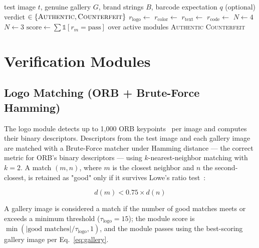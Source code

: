 \documentclass[conference]{IEEEtran}
\begin{document}
\begin{algorithm}[t]
\caption{Cascade Verification}
\label{alg:cascade}
\begin{algorithmic}[1]
\Require test image $t$, genuine gallery $G$, brand strings $B$, barcode expectation $q$ (optional)
\Ensure verdict $\in \{\textsc{Authentic}, \textsc{Counterfeit}\}$
\State $r_{\text{logo}} \gets$ 
\State $r_{\text{color}} \gets$ 
\State $r_{\text{text}} \gets$ 
    \State $r_{\text{code}} \gets$ 
    \State $N \gets 4$
\Else
    \State $N \gets 3$
\EndIf
\State $\text{score} \gets \sum \mathbb{1}[r_m = \text{pass}]$ over active modules
    \State \Return \textsc{Authentic}
\Else
    \State \Return \textsc{Counterfeit}
\EndIf
\end{algorithmic}
\end{algorithm}

\section{Verification Modules}
\label{sec:modules}

\subsection{Logo Matching (ORB + Brute-Force Hamming)}

The logo module detects up to 1{,}000 ORB keypoints~\cite{orb2011} per
image and computes their binary descriptors. Descriptors from the test
image and each gallery image are matched with a Brute-Force matcher under
Hamming distance --- the correct metric for ORB's binary descriptors ---
using $k$-nearest-neighbor matching with $k=2$. A match $(m, n)$, where
$m$ is the closest neighbor and $n$ the second-closest, is retained as
"good" only if it survives Lowe's ratio test~\cite{lowe2004}:

\begin{equation}
d(m) < 0.75 \times d(n)
\end{equation}

A gallery image is considered a match if the number of good matches meets
or exceeds a minimum threshold ($\tau_{\text{logo}} = 15$); the module
score is $\min(|\text{good matches}| / \tau_{\text{logo}}, 1)$, and the
module passes using the best-scoring gallery image per
Eq.~\eqref{eq:gallery}.
\end{document}
